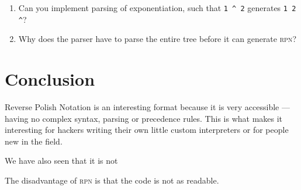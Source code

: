 \documentclass[a4paper,twocolumn]{article}
\begin{document}
\begin{enumerate}
  \item Can you implement parsing of exponentiation, such that \verb|1 ^ 2| generates \verb|1 2 ^|?
  \item Why does the parser have to parse the entire tree before it can generate \textsc{rpn}?
\end{enumerate}

\section{Conclusion}

Reverse Polish Notation is an interesting format because it is very accessible — having no complex syntax, parsing or precedence rules. This is what makes it interesting for hackers writing their own little custom interpreters or for people new in the field.

We have also seen that it is not 

The disadvantage of \textsc{rpn} is that the code is not as readable.
\end{document}
